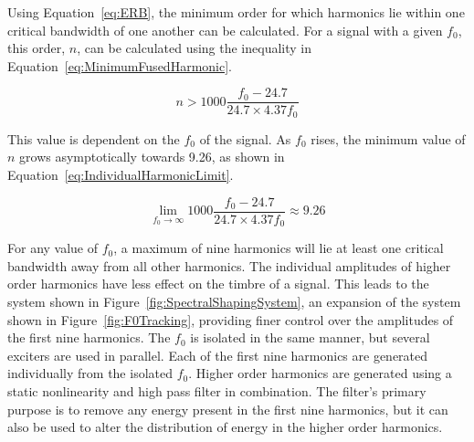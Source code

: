 		Using Equation~\ref{eq:ERB}, the minimum order for which harmonics lie within one critical bandwidth of one
		another can be calculated. For a signal with a given $f_{0}$, this order, $n$, can be calculated using the
		inequality in Equation~\ref{eq:MinimumFusedHarmonic}.


		\begin{equation}
			n > 1000 \frac{f_{0} - 24.7}{24.7 \times 4.37f_{0}}
			\label{eq:MinimumFusedHarmonic}
		\end{equation}

		This value is dependent on the $f_{0}$ of the signal. As $f_{0}$ rises, the minimum value of $n$ grows
		asymptotically towards 9.26, as shown in Equation~\ref{eq:IndividualHarmonicLimit}.

		\begin{equation}
			\lim_{f_{0} \to \infty} 1000 \frac{f_{0} - 24.7}{24.7 \times 4.37f_{0}} \approx 9.26
			\label{eq:IndividualHarmonicLimit}
		\end{equation}

		For any value of $f_{0}$, a maximum of nine harmonics will lie at least one critical bandwidth away from
		all other harmonics. The individual amplitudes of higher order harmonics have less effect on the timbre of
		a signal. This leads to the system shown in Figure~\ref{fig:SpectralShapingSystem}, an expansion of the
		system shown in Figure~\ref{fig:F0Tracking}, providing finer control over the amplitudes of the first nine
		harmonics. The $f_{0}$ is isolated in the same manner, but several exciters are used in parallel. Each of
		the first nine harmonics are generated individually from the isolated $f_{0}$. Higher order harmonics are
		generated using a static nonlinearity and high pass filter in combination. The filter's primary purpose is
		to remove any energy present in the first nine harmonics, but it can also be used to alter the distribution
		of energy in the higher order harmonics.

